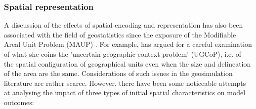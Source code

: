 \documentclass{JASSS}
\begin{document}
\subsubsection{Spatial representation}
A discussion of the effects of spatial encoding and representation has also been associated with the field of geostatistics since the exposure of the Modifiable Areal Unit Problem (MAUP) \citep{Openshaw1984, FotheringhamWong1991}. For example, \citet{Kwan2012} has argued for a careful examination of what she coins the 'uncertain geographic context problem' (UGCoP), i.e. of the spatial configuration of geographical units even when the size and delineation of the area are the same. Considerations of such issues in the geosimulation literature are rather scarce. However, there have been some noticeable attempts at analysing the impact of three types of initial spatial characteristics on model outcomes:
\end{document}

